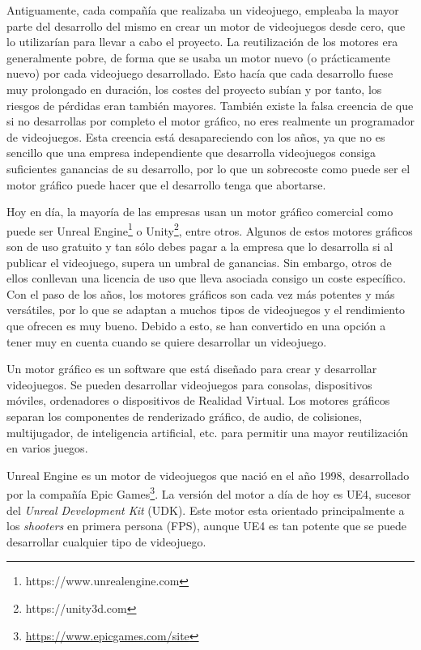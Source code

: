 Antiguamente, cada compañía que realizaba un videojuego, empleaba la mayor parte del desarrollo del mismo en crear un motor de videojuegos desde cero, que lo utilizarían para llevar a cabo el proyecto. La reutilización de los motores era generalmente pobre, de forma que se usaba un motor nuevo (o prácticamente nuevo) por cada videojuego desarrollado. Esto hacía que cada desarrollo fuese muy prolongado en duración, los costes del proyecto subían y por tanto, los riesgos de pérdidas eran también mayores. También existe la falsa creencia de que si no desarrollas por completo el motor gráfico, no eres realmente un programador de videojuegos. Esta creencia está desapareciendo con los años, ya que no es sencillo que una empresa independiente que desarrolla videojuegos consiga suficientes ganancias de su desarrollo, por lo que un sobrecoste como puede ser el motor gráfico puede hacer que el desarrollo tenga que abortarse.

\pagestyle{notsection}

Hoy en día, la mayoría de las empresas usan un motor gráfico comercial como puede ser Unreal Engine\footnote{https://www.unrealengine.com} o Unity\footnote{https://unity3d.com}, entre otros. Algunos de estos motores gráficos son de uso gratuito y tan sólo debes pagar a la empresa que lo desarrolla si al publicar el videojuego, supera un umbral de ganancias. Sin embargo, otros de ellos conllevan una licencia de uso que lleva asociada consigo un coste específico. Con el paso de los años, los motores gráficos son cada vez más potentes y más versátiles, por lo que se adaptan a muchos tipos de videojuegos y el rendimiento que ofrecen es muy bueno. Debido a esto, se han convertido en una opción a tener muy en cuenta cuando se quiere desarrollar un videojuego. 

Un motor gráfico \cite{5} es un software que está diseñado para crear y desarrollar videojuegos. Se pueden desarrollar videojuegos para consolas, dispositivos móviles, ordenadores o dispositivos de Realidad Virtual. Los motores gráficos separan los componentes de renderizado gráfico, de audio, de colisiones, multijugador, de inteligencia artificial, etc. para permitir una mayor reutilización en varios juegos.

Unreal Engine es un motor de videojuegos que nació en el año 1998, desarrollado por la compañía Epic Games\footnote{\url{https://www.epicgames.com/site}}. La versión del motor a día de hoy es \acf{UE4}, sucesor del \textit{Unreal Development Kit} (UDK). Este motor esta orientado principalmente a los \textit{shooters} en primera persona (FPS), aunque \acs{UE4} es tan potente que se puede desarrollar cualquier tipo de videojuego.

